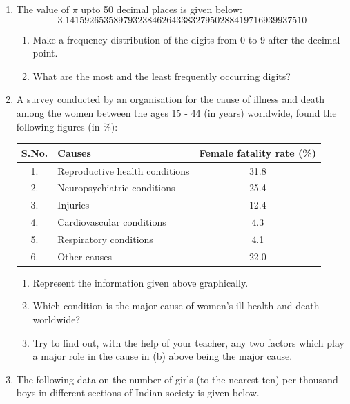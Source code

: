 \documentclass[a4paper,leqno,12pt]{amsart}
\begin{document}
\begin{enumerate}
\item The value of $\pi$ upto 50 decimal places is given below:
\[
3.14159265358979323846264338327950288419716939937510
\]
\begin{enumerate}
 \item Make a frequency distribution of the digits from 0 to 9 after the decimal point.
 \item What are the most and the least frequently occurring digits?
\end{enumerate}

\item A survey conducted by an organisation for the cause of illness and death among
the women between the ages 15 - 44 (in years) worldwide, found the following
figures (in \%):

\begin{center}
 \begin{tabular}{|c|l|c|}
  \hline
  \textbf{S.No.} & \textbf{Causes} & \textbf{Female fatality rate (\%)} \\
  \hline
  1. & Reproductive health conditions & 31.8 \\
  2. & Neuropsychiatric conditions & 25.4 \\
  3. & Injuries & 12.4 \\
  4. & Cardiovascular conditions & 4.3 \\
  5. & Respiratory conditions & 4.1 \\
  6. & Other causes & 22.0 \\
  \hline
 \end{tabular}
\end{center}

\begin{enumerate}
 \item Represent the information given above graphically.
 \item Which condition is the major cause of women’s ill health and death worldwide?
 \item Try to find out, with the help of your teacher, any two factors which play a major
role in the cause in (b) above being the major cause.
\end{enumerate}

\item The following data on the number of girls (to the nearest ten) per thousand boys in
different sections of Indian society is given below.


\end{enumerate}
\end{document}
